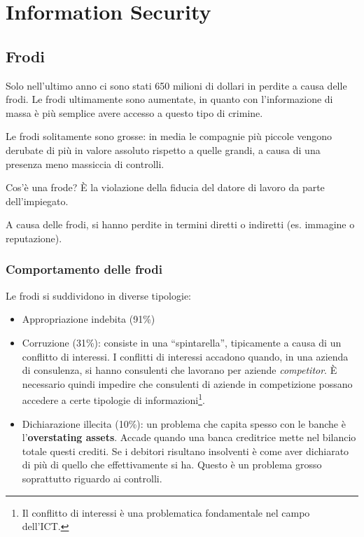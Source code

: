 \part{Information Security}

\chapter{Frodi}
\label{Frodi}

Solo nell'ultimo anno ci sono stati 650 milioni di dollari in perdite a causa delle 
frodi. Le frodi ultimamente sono aumentate, in quanto con l'informazione di massa 
è più semplice avere accesso a questo tipo di crimine.

Le frodi solitamente sono grosse: in media le compagnie più piccole vengono
derubate di più in valore assoluto rispetto a quelle grandi, a causa di una 
presenza meno massiccia di controlli.

Cos'è una frode? È la violazione della fiducia del datore di lavoro da parte 
dell'impiegato.

A causa delle frodi, si hanno perdite in termini diretti o 
indiretti (es. immagine o reputazione).

\section{Comportamento delle frodi}

Le frodi si suddividono in diverse tipologie:

\begin{itemize}
  \item Appropriazione indebita (91\%)
  \item Corruzione (31\%): consiste in una ``spintarella'', tipicamente a causa di un conflitto di 
  interessi. I conflitti di interessi accadono quando, in una azienda di 
  consulenza, si hanno consulenti che lavorano per aziende \textit{competitor}.
  È necessario quindi impedire che consulenti di aziende in competizione possano 
  accedere a   certe tipologie di informazioni\footnote{Il conflitto di interessi è una
  problematica fondamentale nel campo dell'ICT.}.
  \item Dichiarazione illecita (10\%): un problema che capita spesso con le banche è l'\textbf{overstating assets}.
  Accade quando una banca creditrice mette nel bilancio totale questi crediti.
  Se i debitori risultano insolventi è come aver dichiarato di più di quello
  che effettivamente si ha. Questo è un problema grosso soprattutto riguardo ai
  controlli.
\end{itemize}
